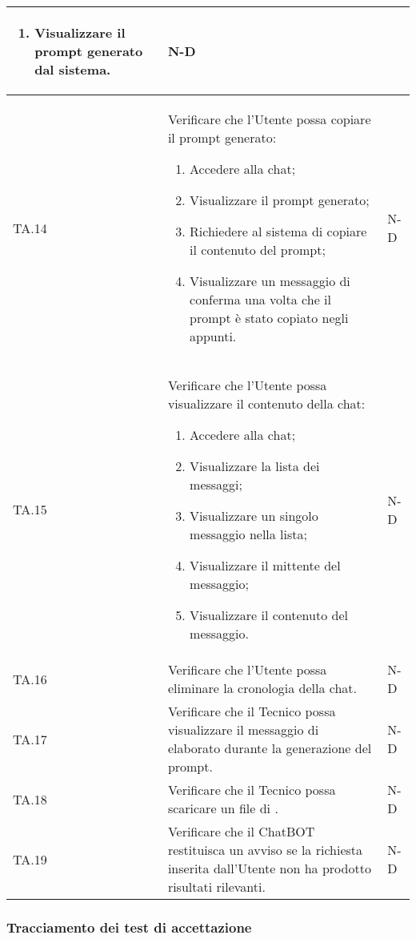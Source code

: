 \begin{adjustwidth}{-0.5cm}{-0.5cm}
\begin{longtable}{|P{1.5cm}|>{\raggedright}P{9.5cm}|>{\arraybackslash}P{1.5cm}|}
\begin{enumerate}
			\item Visualizzare il prompt generato dal sistema.
		\end{enumerate}
		& N-D \\
		\hline TA.14 & Verificare che l'Utente possa copiare il prompt generato:
		\begin{enumerate}
			\item Accedere alla chat;
			\item Visualizzare il prompt generato;
			\item Richiedere al sistema di copiare il contenuto del prompt;
			\item Visualizzare un messaggio di conferma una volta che il prompt è stato copiato negli appunti.
		\end{enumerate}
		& N-D \\
		\hline TA.15 & Verificare che l'Utente possa visualizzare il contenuto della chat:
		\begin{enumerate}
			\item Accedere alla chat;
			\item Visualizzare la lista dei messaggi;
			\item Visualizzare un singolo messaggio nella lista;
			\item Visualizzare il mittente del messaggio;
			\item Visualizzare il contenuto del messaggio.
		\end{enumerate}
		& N-D \\
		\hline TA.16 & Verificare che l'Utente possa eliminare la cronologia della chat. & N-D \\
		\hline TA.17 & Verificare che il Tecnico possa visualizzare il messaggio di  elaborato durante la generazione del prompt. & N-D \\
		\hline TA.18 & Verificare che il Tecnico possa scaricare un file di . & N-D \\
		\hline TA.19 & Verificare che il ChatBOT restituisca un avviso se la richiesta inserita dall'Utente non ha prodotto risultati rilevanti. & N-D \\
	\end{longtable}
\end{adjustwidth}
\egroup

\clearpage
\subsubsection{Tracciamento dei test di accettazione}

